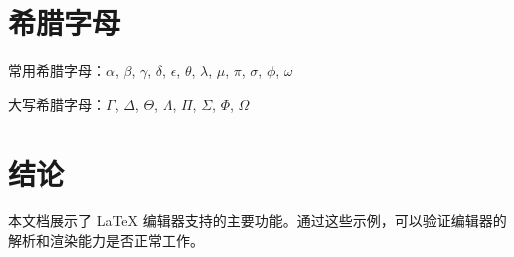 \documentclass{article}
\begin{document}
\section{希腊字母}

常用希腊字母：$\alpha$, $\beta$, $\gamma$, $\delta$, $\epsilon$, $\theta$, $\lambda$, $\mu$, $\pi$, $\sigma$, $\phi$, $\omega$

大写希腊字母：$\Gamma$, $\Delta$, $\Theta$, $\Lambda$, $\Pi$, $\Sigma$, $\Phi$, $\Omega$

\section{结论}

本文档展示了 LaTeX 编辑器支持的主要功能。通过这些示例，可以验证编辑器的解析和渲染能力是否正常工作。
\end{document}
